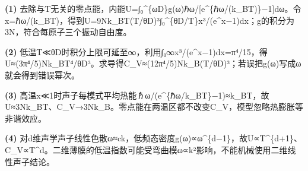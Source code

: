 \par\noindent\textbf{(1)} 去除与T无关的零点能，内能U=∫₀\textasciicircum{}\{ωD\}g(ω)ℏω/[e\textasciicircum{}\{ℏω/(k\_BT)\}−1]dω。令x=ℏω/(k\_BT)，得到U=9Nk\_BT(T/θD)³∫₀\textasciicircum{}\{θD/T\}x³/(e\textasciicircum{}x−1)dx；g的积分为3N，符合每原子三个振动自由度。
\par\noindent\textbf{(2)} 低温T≪θD时积分上限可延至∞，利用∫₀∞x³/(e\textasciicircum{}x−1)dx=π⁴/15，得U≈(3π⁴/5)Nk\_BT⁴/θD³。求导得C\_V≈(12π⁴/5)Nk\_B(T/θD)³；若误把g(ω)写成ω就会得到错误幂次。
\par\noindent\textbf{(3)} 高温x≪1时声子每模式平均热能ℏω/(e\textasciicircum{}\{ℏω/k\_BT\}−1)≈k\_BT，故U≈3Nk\_BT、C\_V→3Nk\_B。零点能在两温区都不改变C\_V，模型忽略热膨胀等非谐效应。
\par\noindent\textbf{(4)} 对d维声学声子线性色散ω≈ck，低频态密度g(ω)∝ω\textasciicircum{}\{d−1\}，故U∝T\textasciicircum{}\{d+1\}、C\_V∝T\textasciicircum{}d。二维薄膜的低温指数可能受弯曲模ω∝k²影响，不能机械使用二维线性声子结论。
